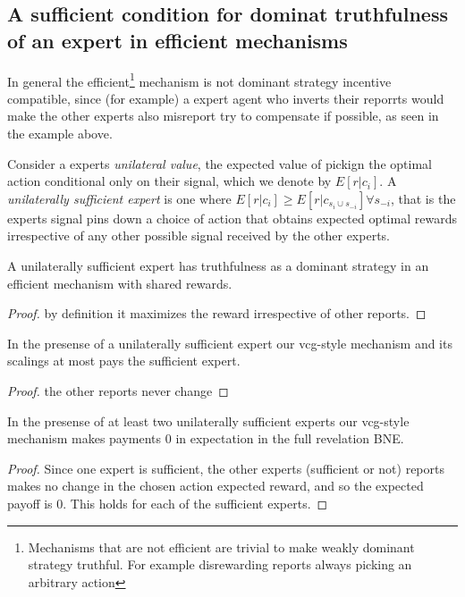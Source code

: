 \subsection{A sufficient condition for dominat truthfulness of an expert in efficient mechanisms}

In general the efficient\footnote{Mechanisms that are not efficient are trivial to make weakly dominant strategy truthful. For example disrewarding reports always picking an arbitrary action} mechanism is not dominant strategy incentive compatible, since (for example) a expert agent who inverts their reporrts would make the other experts also misreport try to compensate if possible, as seen in the example above.

Consider a experts \emph{unilateral value}, the expected value of pickign the optimal action conditional only on their signal, which we denote by  $E[ r| c_{i}]$. A \emph{unilaterally sufficient expert} is one where $E[r|c_{i}] \geq E[r|c_{s_i \cup s_{-i}}] \forall s_{-i}$, that is the experts signal pins down a choice of action that obtains expected optimal rewards irrespective of any other possible signal received by the other experts.

\begin{lem}
	A unilaterally sufficient expert has truthfulness as a dominant strategy in an efficient mechanism with shared rewards.
\end{lem}

\begin{proof}
    by definition it maximizes the reward irrespective of other reports.
\end{proof}

\begin{lem}
	In the presense of a unilaterally sufficient expert our vcg-style mechanism and its scalings at most pays the sufficient expert.
\end{lem}

\begin{proof}
    the other reports never change 
\end{proof}


\begin{lem}
	In the presense of at least two unilaterally sufficient experts our vcg-style mechanism makes payments 0 in expectation in the full revelation BNE. 
\end{lem}

\begin{proof}
    Since one expert is sufficient, the other experts (sufficient or not) reports makes no change in the chosen action expected reward, and so the expected payoff is 0. This holds for each of the sufficient experts.
\end{proof}







